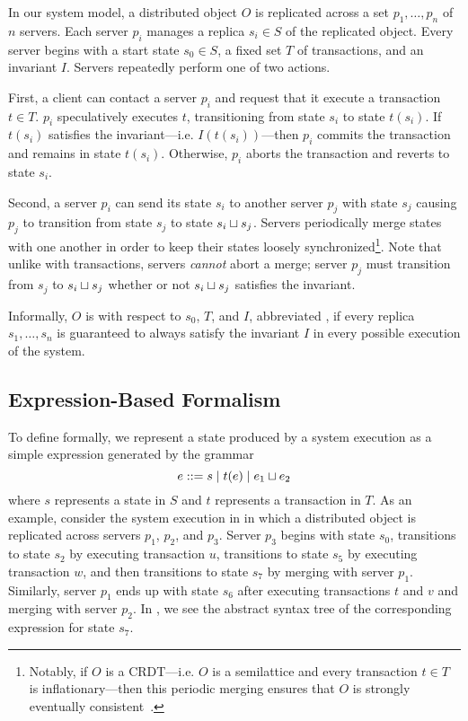 In our system model, a distributed object $O$ is replicated across a set $p_1,
\ldots, p_n$ of $n$ servers. Each server $p_i$ manages a replica $s_i \in S$ of
the replicated object. Every server begins with a start state $s_0 \in S$, a
fixed set $T$ of transactions, and an invariant $I$. Servers repeatedly perform
one of two actions.

First, a client can contact a server $p_i$ and request that it execute a
transaction $t \in T$. $p_i$ speculatively executes $t$, transitioning from
state $s_i$ to state $t(s_i)$. If $t(s_i)$ satisfies the invariant---i.e.
$I(t(s_i))$---then $p_i$ commits the transaction and remains in state $t(s_i)$.
Otherwise, $p_i$ aborts the transaction and reverts to state $s_i$.

Second, a server $p_i$ can send its state $s_i$ to another server $p_j$ with
state $s_j$ causing $p_j$ to transition from state $s_j$  to state $s_i \sqcup
s_j$. Servers periodically merge states with one another in order to keep their
states loosely synchronized\footnote{%
  Notably, if $O$ is a CRDT---i.e. $O$ is a semilattice and every transaction
  $t \in T$ is inflationary---then this periodic merging ensures that $O$ is
  strongly eventually consistent~\cite{shapiro2011conflict}.
}.
Note that unlike with transactions, servers \emph{cannot} abort a merge; server
$p_j$ must transition from $s_j$ to $s_i \sqcup s_j$ whether or not $s_i \sqcup
s_j$ satisfies the invariant.

Informally, $O$ is  with respect to $s_0$, $T$,
and $I$, abbreviated , if every replica $s_1, \ldots,
s_n$ is guaranteed to always satisfy the invariant $I$ in every possible
execution of the system.

\subsection{Expression-Based Formalism}
To define \invariantconfluence{} formally, we represent a state produced by a
system execution as a simple expression generated by the grammar
%
\[
  \hfill
  e ::= s \mid t(e) \mid e_1 \join e_2
  \hfill
\]
%
where $s$ represents a state in $S$ and $t$ represents a transaction in $T$. As
an example, consider the system execution in  in which
a distributed object is replicated across servers $p_1$, $p_2$, and $p_3$.
Server $p_3$ begins with state $s_0$, transitions to state $s_2$ by executing
transaction $u$, transitions to state $s_5$ by executing transaction $w$, and
then transitions to state $s_7$ by merging with server $p_1$. Similarly, server
$p_1$ ends up with state $s_6$ after executing transactions $t$ and $v$ and
merging with server $p_2$. In , we see the abstract syntax
tree of the corresponding expression for state $s_7$.

